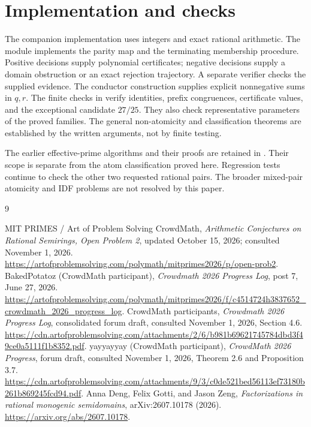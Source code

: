 \documentclass[11pt]{article}
\theoremstyle{definition}
\begin{document}
\section{Implementation and checks}
The companion implementation uses integers and exact rational arithmetic.
The module  implements the parity map and the
terminating membership procedure. Positive decisions supply polynomial
certificates; negative decisions supply a domain obstruction or an exact
rejection trajectory. A separate verifier checks the supplied evidence.
The conductor construction supplies explicit nonnegative sums in $q,r$.
The finite checks in  verify
identities, prefix congruences, certificate values, and the exceptional
candidate $27/25$. They also check representative parameters of the
proved families. The general non-atomicity and classification theorems
are established by the written arguments, not by finite testing.

The earlier effective-prime algorithms and their proofs are retained
in . Their scope is separate
from the atom classification proved here. Regression tests continue
to check the other two requested rational pairs. The broader mixed-pair
atomicity and IDF problems are not resolved by this paper.

\begin{thebibliography}{9}
\raggedright
{}
MIT PRIMES / Art of Problem Solving CrowdMath,
\emph{Arithmetic Conjectures on Rational Semirings, Open Problem 2},
updated October 15, 2026; consulted November 1, 2026.
\url{https://artofproblemsolving.com/polymath/mitprimes2026/p/open-prob2}.
BakedPotatoz (CrowdMath participant),
\emph{Crowdmath 2026 Progress Log}, post 7, June 27, 2026.
\url{https://artofproblemsolving.com/polymath/mitprimes2026/f/c4514724h3837652_crowdmath_2026_progress_log}.
CrowdMath participants, \emph{Crowdmath 2026 Progress Log},
consolidated forum draft, consulted November 1, 2026, Section 4.6.
\url{https://cdn.artofproblemsolving.com/attachments/2/6/b981b69621745784dbd3f49ce0a5111f1b8352.pdf}.
yayyayyay (CrowdMath participant), \emph{CrowdMath 2026 Progress},
forum draft, consulted November 1, 2026, Theorem 2.6 and Proposition 3.7.
\url{https://cdn.artofproblemsolving.com/attachments/9/3/c0de521bed56113ef73180b261b869245fcd94.pdf}.
Anna Deng, Felix Gotti, and Jason Zeng,
\emph{Factorizations in rational monogenic semidomains},
arXiv:2607.10178 (2026).
\url{https://arxiv.org/abs/2607.10178}.
\end{thebibliography}
\end{document}
